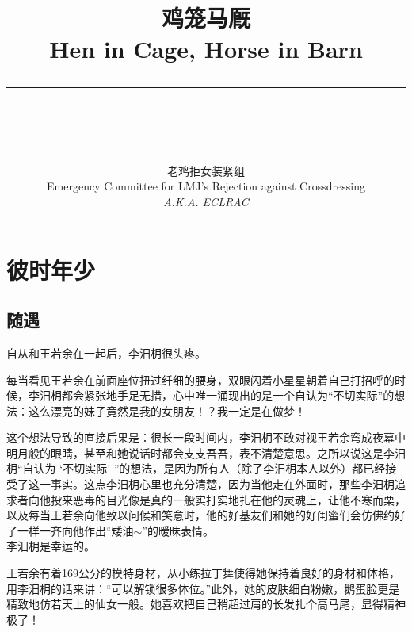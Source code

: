 \documentclass[UTF8]{book}
\title{\Huge\textbf{鸡笼马厩} \\
		\Large Hen in Cage, Horse in Barn \\
		[8pt] 
	\rule{\linewidth}{0.5pt} \\
		[20pt]}
\author{\large 老鸡拒女装紧组 \\
		\large Emergency Committee for LMJ's Rejection against Crossdressing \\
		\normalsize \textit{A.K.A. ECLRAC}}
\begin{document}
\maketitle
\tableofcontents

\part{彼时年少}
	\chapter{随遇}
		自从和王若余在一起后，李汨枂很头疼。
		
		每当看见王若余在前面座位扭过纤细的腰身，双眼闪着小星星朝着自己打招呼的时候，李汨枂都会紧张地手足无措，心中唯一涌现出的是一个自认为``不切实际''的想法：这么漂亮的妹子竟然是我的女朋友！？我一定是在做梦！
		
		这个想法导致的直接后果是：很长一段时间内，李汨枂不敢对视王若余弯成夜幕中明月般的眼睛，甚至和她说话时都会支支吾吾，表不清楚意思。之所以说这是李汨枂``自认为 `不切实际' ''的想法，是因为所有人（除了李汨枂本人以外）都已经接受了这一事实。这点李汨枂心里也充分清楚，因为当他走在外面时，那些李汨枂追求者向他投来恶毒的目光像是真的一般实打实地扎在他的灵魂上，让他不寒而栗，以及每当王若余向他致以问候和笑意时，他的好基友们和她的好闺蜜们会仿佛约好了一样一齐向他作出``矮油$\sim$''的暧昧表情。 \\[5pt]
		
		李汨枂是幸运的。
		
		王若余有着169公分的模特身材，从小练拉丁舞使得她保持着良好的身材和体格，用李汨枂的话来讲：``可以解锁很多体位。''此外，她的皮肤细白粉嫩，鹅蛋脸更是精致地仿若天上的仙女一般。她喜欢把自己稍超过肩的长发扎个高马尾，显得精神极了！
		
		
	
	
\end{document}
